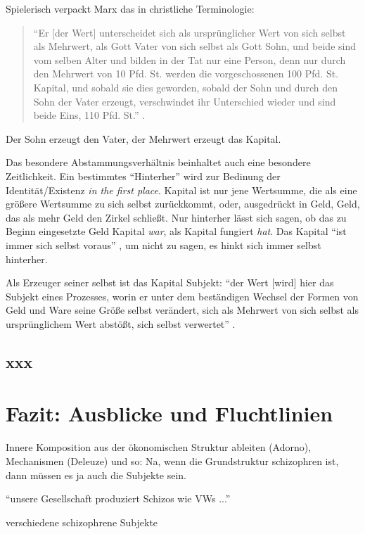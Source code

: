 \documentclass[12pt,
               DIV13,
               paper=a4,
               twoside=false,
               onehalfspacing,
               bibliography=totoc,
               toc=graduated,
               draft,
               ]{scrartcl}
\newcommand{\pc}[2]{\parencite[#1]{#2}}
\begin{document}
Spielerisch verpackt Marx das in christliche Terminologie:
%
\begin{spacing}{1}
\begin{quote}
"`Er [der Wert] unterscheidet sich als ursprünglicher
Wert von sich selbst als Mehrwert, als Gott Vater von sich selbst als
Gott Sohn, und beide sind vom selben Alter und bilden in der Tat nur
eine Person, denn nur durch den Mehrwert von 10 Pfd. St. werden die
vorgeschossenen 100 Pfd. St. Kapital, und sobald sie dies geworden,
sobald der Sohn und durch den Sohn der Vater erzeugt, verschwindet ihr
Unterschied wieder und sind beide Eins, 110 Pfd. St."' \pc{S. 169
f.}{kap}.
\end{quote}
\end{spacing}

Der Sohn erzeugt den Vater, der Mehrwert erzeugt das Kapital.

Das besondere Abstammungsverhältnis beinhaltet auch eine besondere
Zeitlichkeit. Ein bestimmtes "`Hinterher"' wird zur Bedinung der
Identität/Existenz \emph{in the first place}. Kapital ist nur jene
Wertsumme, die als eine größere Wertsumme zu sich selbst zurückkommt,
oder, ausgedrückt in Geld, Geld, das als mehr Geld den Zirkel
schließt. Nur hinterher lässt sich sagen, ob das zu Beginn eingesetzte
Geld Kapital \emph{war}, als Kapital fungiert \emph{hat}. Das Kapital
"`ist immer sich selbst voraus"' \pc{125}{strauss}, um nicht zu sagen,
es hinkt sich immer selbst hinterher.

Als Erzeuger seiner selbst ist das Kapital Subjekt: "`der Wert [wird]
hier das Subjekt eines Prozesses, worin er unter dem beständigen
Wechsel der Formen von Geld und Ware seine Größe selbst verändert,
sich als Mehrwert von sich selbst als ursprünglichem Wert abstößt,
sich selbst verwertet"' \pc{169}{kap}.


\subsection{xxx}


\section{Fazit: Ausblicke und Fluchtlinien}

Innere Komposition aus der ökonomischen Struktur ableiten (Adorno),
Mechanismen (Deleuze) und so: Na, wenn die Grundstruktur schizophren
ist, dann müssen es ja auch die Subjekte sein.

"`unsere Gesellschaft produziert Schizos wie VWs ..."'

verschiedene schizophrene Subjekte


\newpage
\printshorthands
\printbibliography
\end{document}
